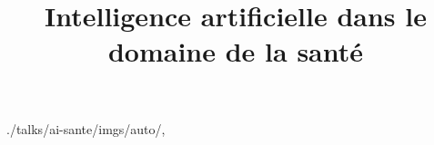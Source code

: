 

\title{Intelligence artificielle dans le domaine de la santé}


\usefootlinefortitlepage

\begin{graphicspathcontext}{{./talks/ai-sante/imgs/auto/},\old}
\end{graphicspathcontext}




\endinput
